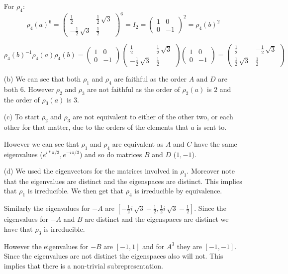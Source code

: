 \documentclass[10pt]{article}
\theoremstyle{plain}
\theoremstyle{remark}
\begin{document}
\begin{enumerate}
  For $\rho_4$:
    \[
    \rho_4(a)^6=
\left(\begin{array}{rr}
\frac{1}{2} & \frac{1}{2} \, \sqrt{3} \\
-\frac{1}{2} \, \sqrt{3} & \frac{1}{2}
\end{array}\right)^6
    =
    I_2
    =
    \left(
      \begin{array}{rr}
        1 & 0 \\
        0 & -1
      \end{array}
    \right)^2
    =
    \rho_4(b)^2
  \]

  \[
    \rho_4(b)^{-1}\rho_4(a)\rho_4(b)
    =
    \left(
      \begin{array}{rr}
        1 & 0 \\
        0 & -1
      \end{array}
    \right)
    \left(\begin{array}{rr}
\frac{1}{2} & \frac{1}{2} \, \sqrt{3} \\
-\frac{1}{2} \, \sqrt{3} & \frac{1}{2}
\end{array}\right)
    \left(
      \begin{array}{rr}
        1 & 0 \\
        0 & -1
      \end{array}
    \right)
    =
    \left(\begin{array}{rr}
\frac{1}{2} & -\frac{1}{2} \, \sqrt{3} \\
\frac{1}{2} \, \sqrt{3} & \frac{1}{2}
\end{array}\right)
  \]

\item[(b)] We can see that both $\rho_1$ and $\rho_4$ are faithful
  as the order $A$ and $D$ are both 6. However $\rho_2$ and $\rho_3$
  are not faithful as the order of $\rho_2(a)$ is $2$ and the order of
  $\rho_3(a)$ is $3$.
\item[(c)] To start $\rho_2$ and $\rho_3$ are not equivalent to either of the
  other two, or each other for that matter, due to the orders of the elements
  that $a$ is sent to.

  However we can see that $\rho_1$ and $\rho_4$ are equivalent as $A$ and $C$ have the
  same eigenvalues ($e^{i*\pi/3},e^{-i\pi/3}$) and so do matrices $B$ and $D$ ($1,-1$).
\item[(d)] We used the eigenvectors for the matrices involved in $\rho_1$. Moreover
  note that the eigenvalues are distinct and the eigenspaces are distinct. This implies
  that $\rho_1$ is irreducible. We then get that $\rho_4$ is irreducible by equivalence.

  Similarly the eigenvalues for $-A$ are
  $\left[-\frac{1}{2} i \, \sqrt{3} - \frac{1}{2}, \frac{1}{2} i \, \sqrt{3} - \frac{1}{2}\right]$.
  Since the eigenvalues for $-A$ and $B$ are distinct and the eigenspaces are
  distinct we have that $\rho_3$ is irreducible.

  However the eigenvalues for $-B$ are $[-1,1]$ and for $A^3$ they are $[-1,-1]$. Since
  the eigenvalues are not distinct the eigenspaces also will not. This implies that there
  is a non-trivial subrepresentation.
\end{enumerate}
\end{document}

